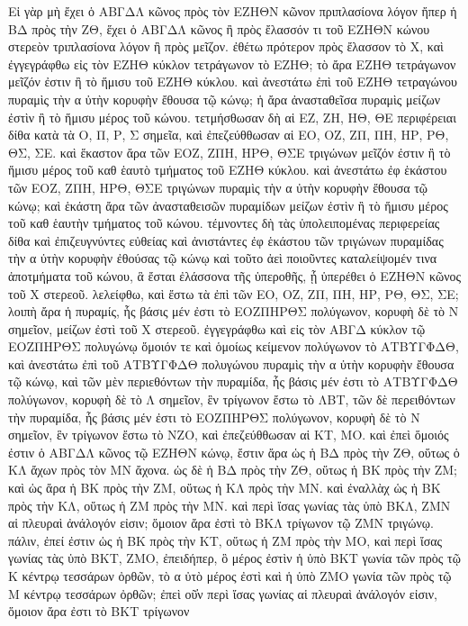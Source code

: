 \begin{Parallel}{}{}
{{\greekfont Εἰ γὰρ μὴ ἔχει ὁ ΑΒΓΔΛ κῶνος πρὸς τὸν ΕΖΗΘΝ κῶνον πριπλασίονα
λόγον ἤπερ ἡ ΒΔ πρὸς τὴν ΖΘ, ἕχει ὁ ΑΒΓΔΛ κῶνος ἢ πρὸς ἔλασσόν
τι τοῦ ΕΖΗΘΝ κώνου στερεὸν τριπλασίονα λόγον ἢ πρὸς μεῖζον. ἐθέτω
πρότερον πρὸς ἔλασσον τὸ Χ, καὶ ἐγγεγράφθω εἰς τὸν ΕΖΗΘ κύκλον
τετράγωνον τὸ ΕΖΗΘ; τὸ ἄρα ΕΖΗΘ τετράγωνον μεῖζόν ἐστιν ἢ τὸ
ἥμισυ τοῦ ΕΖΗΘ κύκλου. καὶ ἀνεστάτω ἐπὶ τοῦ ΕΖΗΘ τετραγώνου
πυραμὶς τὴν α ὐτὴν κορυφὴν ἔθουσα τῷ κώνῳ; ἡ ἄρα ἀνασταθεῖσα
πυραμὶς μείζων ἐστὶν ἢ τὸ ἥμισυ μέρος τοῦ κώνου. τετμήσθωσαν
δὴ αἱ ΕΖ, ΖΗ, ΗΘ, ΘΕ περιφέρειαι δίθα κατὰ τὰ Ο, Π, Ρ, Σ σημεῖα,
καὶ ἐπεζεύθθωσαν αἱ ΕΟ, ΟΖ, ΖΠ, ΠΗ, ΗΡ, ΡΘ, ΘΣ, ΣΕ. καὶ ἕκαστον ἄρα
τῶν ΕΟΖ, ΖΠΗ, ΗΡΘ, ΘΣΕ τριγώνων μεῖζόν ἐστιν ἢ τὸ ἥμισυ
μέρος τοῦ καθ ἑαυτὸ τμήματος τοῦ ΕΖΗΘ κύκλου. καὶ ἀνεστάτω
ἐφ ἑκάστου τῶν ΕΟΖ, ΖΠΗ, ΗΡΘ, ΘΣΕ τριγώνων
πυραμὶς τὴν α ὐτὴν κορυφὴν ἔθουσα τῷ κώνῳ; καὶ ἑκάστη ἄρα τῶν
ἀνασταθεισῶν πυραμίδων μείζων ἐστὶν ἢ τὸ ἥμισυ μέρος τοῦ καθ ἑαυτὴν
τμήματος τοῦ κώνου.
 τέμνοντες δὴ τὰς ὑπολειπομένας περιφερείας
δίθα καὶ ἐπιζευγνύντες εὐθείας καὶ ἀνιστάντες ἐφ ἑκάστου
τῶν τριγώνων πυραμίδας τὴν α ὐτὴν κορυφὴν ἐθούσας τῷ κώνῳ καὶ
τοῦτο ἀεὶ ποιοῦντες καταλείψομέν τινα ἀποτμήματα τοῦ κώνου, ἃ ἔσται
ἐλάσσονα τῆς ὑπεροθῆς, ᾗ ὑπερέθει ὁ ΕΖΗΘΝ κῶνος τοῦ Χ στερεοῦ.
λελείφθω, καὶ ἔστω τὰ ἐπὶ τῶν ΕΟ, ΟΖ, ΖΠ, ΠΗ, ΗΡ, ΡΘ, ΘΣ, ΣΕ;
λοιπὴ ἄρα ἡ πυραμίς, ἧς βάσις μέν ἐστι τὸ ΕΟΖΠΗΡΘΣ πολύγωνον,
κορυφὴ δὲ τὸ Ν σημεῖον, μείζων ἐστὶ τοῦ Χ στερεοῦ. ἐγγεγράφθω
καὶ εἰς τὸν ΑΒΓΔ κύκλον τῷ ΕΟΖΠΗΡΘΣ πολυγώνῳ ὅμοιόν τε καὶ
ὁμοίως κείμενον πολύγωνον τὸ ΑΤΒΥΓΦΔΘ, καὶ ἀνεστάτω ἐπὶ
τοῦ ΑΤΒΥΓΦΔΘ πολυγώνου πυραμὶς τὴν α ὐτὴν κορυφὴν ἔθουσα
τῷ κώνῳ, καὶ τῶν μὲν περιεθόντων τὴν πυραμίδα, ἧς βάσις
μέν ἐστι τὸ ΑΤΒΥΓΦΔΘ πολύγωνον, κορυφὴ δὲ τὸ Λ σημεῖον,
ἓν τρίγωνον ἔστω τὸ ΛΒΤ, τῶν δὲ περειθόντων τὴν πυραμίδα,
ἧς βάσις μέν ἐστι τὸ ΕΟΖΠΗΡΘΣ πολύγωνον, κορυφὴ δὲ τὸ
Ν σημεῖον, ἓν τρίγωνον ἔστω τὸ ΝΖΟ, καὶ ἐπεζεύθθωσαν
αἱ ΚΤ, ΜΟ. καὶ ἐπεὶ ὅμοιός ἐστιν ὁ ΑΒΓΔΛ κῶνος τῷ
ΕΖΗΘΝ κώνῳ,  ἔστιν ἄρα ὡς ἡ ΒΔ πρὸς τὴν ΖΘ, οὕτως
ὁ ΚΛ ἄχων πρὸς τὸν ΜΝ ἄχονα. ὡς δὲ ἡ ΒΔ πρὸς τὴν ΖΘ,
οὕτως ἡ ΒΚ πρὸς τὴν ΖΜ; καὶ ὡς ἄρα ἡ ΒΚ πρὸς τὴν ΖΜ, 
οὕτως ἡ ΚΛ πρὸς τὴν ΜΝ. καὶ ἐναλλὰχ ὡς ἡ ΒΚ πρὸς τὴν
ΚΛ, οὕτως ἡ ΖΜ πρὸς τὴν ΜΝ. καὶ περὶ ἴσας γωνίας τὰς
ὑπὸ ΒΚΛ, ΖΜΝ αἱ πλευραὶ ἀνάλογόν εἰσιν; ὅμοιον
ἄρα ἐστὶ τὸ ΒΚΛ τρίγωνον τῷ ΖΜΝ τριγώνῳ. 
πάλιν, ἐπεί ἐστιν ὡς ἡ ΒΚ
πρὸς τὴν ΚΤ, οὕτως ἡ ΖΜ πρὸς τὴν ΜΟ, καὶ περὶ ἴσας γωνίας τὰς ὑπὸ
ΒΚΤ, ΖΜΟ, ἐπειδήπερ, ὃ μέρος ἐστὶν ἡ ὑπὸ ΒΚΤ γωνία τῶν πρὸς
τῷ Κ κέντρῳ τεσσάρων ὀρθῶν, τὸ α ὐτὸ μέρος ἐστὶ καὶ ἡ ὑπὸ ΖΜΟ
γωνία τῶν πρὸς τῷ Μ κέντρῳ τεσσάρων ὀρθῶν; ἐπεὶ οῦ̓ν περὶ
ἴσας γωνίας αἱ πλευραὶ ἀνάλογόν εἰσιν, ὅμοιον ἄρα ἐστι τὸ  ΒΚΤ τρίγωνον
}}
\end{Parallel}
